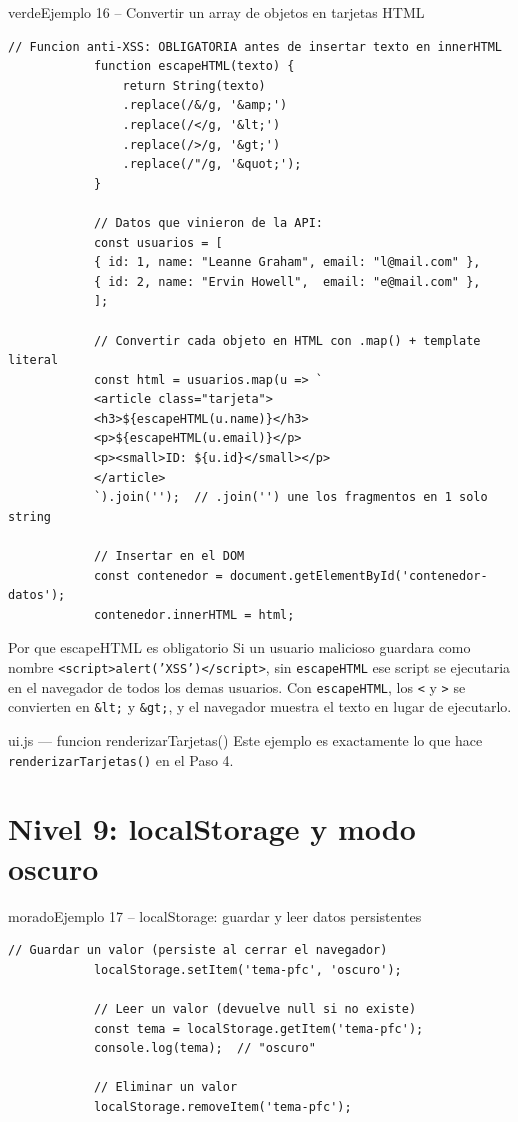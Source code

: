 \documentclass[11pt,a4paper]{article}
\begin{document}
	\begin{cajacodigo}{verde}{Ejemplo 16 -- Convertir un array de objetos en tarjetas HTML}
		\begin{lstlisting}[style=codejs]
			// Funcion anti-XSS: OBLIGATORIA antes de insertar texto en innerHTML
			function escapeHTML(texto) {
				return String(texto)
				.replace(/&/g, '&amp;')
				.replace(/</g, '&lt;')
				.replace(/>/g, '&gt;')
				.replace(/"/g, '&quot;');
			}
			
			// Datos que vinieron de la API:
			const usuarios = [
			{ id: 1, name: "Leanne Graham", email: "l@mail.com" },
			{ id: 2, name: "Ervin Howell",  email: "e@mail.com" },
			];
			
			// Convertir cada objeto en HTML con .map() + template literal
			const html = usuarios.map(u => `
			<article class="tarjeta">
			<h3>${escapeHTML(u.name)}</h3>
			<p>${escapeHTML(u.email)}</p>
			<p><small>ID: ${u.id}</small></p>
			</article>
			`).join('');  // .join('') une los fragmentos en 1 solo string
			
			// Insertar en el DOM
			const contenedor = document.getElementById('contenedor-datos');
			contenedor.innerHTML = html;
		\end{lstlisting}
	\end{cajacodigo}
	
	\begin{cajaconcepto}{Por que escapeHTML es obligatorio}
		Si un usuario malicioso guardara como nombre \texttt{<script>alert('XSS')</script>}, sin \texttt{escapeHTML} ese script se ejecutaria en el navegador de todos los demas usuarios. Con \texttt{escapeHTML}, los \texttt{<} y \texttt{>} se convierten en \texttt{\&lt;} y \texttt{\&gt;}, y el navegador muestra el texto en lugar de ejecutarlo.
	\end{cajaconcepto}
	
	\begin{cajapractica}{ui.js --- funcion renderizarTarjetas()}
		Este ejemplo es exactamente lo que hace \texttt{renderizarTarjetas()} en el Paso 4.
	\end{cajapractica}
	
	\section{Nivel 9: localStorage y modo oscuro}
	
	\begin{cajacodigo}{morado}{Ejemplo 17 -- localStorage: guardar y leer datos persistentes}
		\begin{lstlisting}[style=codejs]
			// Guardar un valor (persiste al cerrar el navegador)
			localStorage.setItem('tema-pfc', 'oscuro');
			
			// Leer un valor (devuelve null si no existe)
			const tema = localStorage.getItem('tema-pfc');
			console.log(tema);  // "oscuro"
			
			// Eliminar un valor
			localStorage.removeItem('tema-pfc');
		\end{lstlisting}
	\end{cajacodigo}
	
\end{document}
